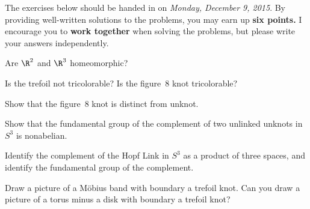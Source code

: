 \documentclass[12pt]{pset}
\author{Jim Fowler}
\date{Autumn 2015}
\begin{document}
\maketitle

\noindent The exercises below should be handed in on \textit{Monday,
  December 9, 2015}.  By providing well-written solutions to the
problems, you may earn up \textbf{six points.}  I encourage you to
\textbf{work together} when solving the problems, but please write
your answers independently.

\begin{problem}

Are $\R^2$ and $\R^3$ homeomorphic?

\end{problem}

\begin{problem}

  Is the trefoil not tricolorable?  Is the figure~8 knot tricolorable?

\end{problem}

\begin{problem}

  Show that the figure~8 knot is distinct from unknot.

\end{problem}

\begin{problem}

  Show that the fundamental group of the complement of two unlinked
  unknots in $S^3$ is nonabelian.

\end{problem}

\begin{problem}

  Identify the complement of the Hopf Link in $S^3$ as a product of
  three spaces, and identify the fundamental group of the complement.
  
\end{problem}

\begin{problem}

  Draw a picture of a M\"obius band with boundary a trefoil knot.  Can
  you draw a picture of a torus minus a disk with boundary a trefoil
  knot?


\end{problem}
\end{document}
